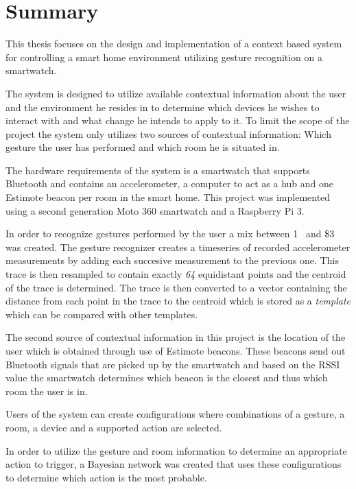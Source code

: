 \section*{Summary}
\label{formalities:summary}

This thesis focuses on the design and implementation of a context based system for controlling a smart home environment utilizing gesture recognition on a smartwatch.

The system is designed to utilize available contextual information about the user and the environment he resides in to determine which devices he wishes to interact with and what change he intends to apply to it.
To limit the scope of the project the system only utilizes two sources of contextual information: Which gesture the user has performed and which room he is situated in.

The hardware requirements of the system is a smartwatch that supports Bluetooth and contains an accelerometer, a computer to act as a hub and one Estimote beacon per room in the smart home.
This project was implemented using a second generation Moto 360 smartwatch and a Raspberry Pi 3.

In order to recognize gestures performed by the user a mix between 1\textcent~\cite{herold20121} and \$3~\cite{threedollar} was created.
The gesture recognizer creates a timeseries of recorded accelerometer measurements by adding each succesive measurement to the previous one.
This trace is then resampled to contain exactly \emph{64} equidistant points and the centroid of the trace is determined.
The trace is then converted to a vector containing the distance from each point in the trace to the centroid which is stored as a \emph{template} which can be compared with other templates.

The second source of contextual information in this project is the location of the user which is obtained through use of Estimote beacons.
These beacons send out Bluetooth signals that are picked up by the smartwatch and based on the RSSI value the smartwatch determines which beacon is the closest and thus which room the user is in.

Users of the system can create configurations where combinations of a gesture, a room, a device and a supported action are selected.

In order to utilize the gesture and room information to determine an appropriate action to trigger, a Bayesian network was created that uses these configurations to determine which action is the most probable.

